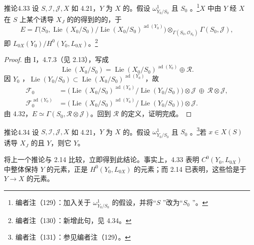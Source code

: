 \begin{SGAresult}{推论}{4.33}
设 $S,\mathscr I,\mathscr J,X$ 如 4.21，$Y$ 为 $X$ 的。假设 $\omega^1_{Y_0/S_0}$ 且 $S_0$ 。\footnote{编者注（129）：加入关于 $\omega^1_{Y_0/S_0}$ 的假设，并将“$S$ ”改为“$S_0$ ”。}$X$ 中由 $Y$ 经 $X$ 在 $S$ 上某个诱导 $X_J$ 的的得到的的，于
\[E=\Gamma\bigl(S_0,\operatorname{Lie}(X_0/S_0)/\operatorname{Lie}(X_0/S_0)^{\operatorname{ad}(Y_0)}\bigr)\otimes_{\Gamma(S_0,\mathscr O_{S_0})}\Gamma(S_0,\mathscr J),\]
即 $L_{0X}(Y_0)/H^0(Y_0,L_{0X})$。\footnote{编者注（130）：新增此句，见 4.34。}
\end{SGAresult}
\begin{proof}
由 I，4.7.3（见 2.13），写成
\[\operatorname{Lie}(X_0/S_0)=\operatorname{Lie}(X_0/S_0)^{\operatorname{ad}(Y_0)}\oplus\mathscr R.\]
因 $Y_0$ ，$\operatorname{Lie}(Y_0/S_0)\subset\operatorname{Lie}(X_0/S_0)^{\operatorname{ad}(Y_0)}$，故
\[
\begin{aligned}
\mathscr F_0&=\bigl(\operatorname{Lie}(X_0/S_0)^{\operatorname{ad}(Y_0)}/\operatorname{Lie}(Y_0/S_0)\bigr)\otimes\mathscr J\ \oplus\ \mathscr R\otimes\mathscr J,\\
\mathscr F_0^{\operatorname{ad}(Y_0)}&=\bigl(\operatorname{Lie}(X_0/S_0)^{\operatorname{ad}(Y_0)}/\operatorname{Lie}(Y_0/S_0)\bigr)\otimes\mathscr J.
\end{aligned}
\]
由 4.32，$E\simeq\Gamma(S_0,\mathscr R\otimes\mathscr J)$。回到 $\mathscr R$ 的定义，证明完成。
\end{proof}
\begin{SGAresult}{推论}{4.34}
设 $S,\mathscr I,\mathscr J,X$ 如 4.21，$Y$ 为 $X$ 的。假设 $\omega^1_{Y_0/S_0}$ 且 $S_0$ 。\footnote{编者注（131）：参见编者注（129）。}若 $x\in X(S)$ 诱导 $X_J$ 的且 $Y$，则它 $Y$。
\end{SGAresult}
将上一个推论与 2.14 比较，立即得到此结论。事实上，4.33 表明 $C^0(Y_0,L_{0X})$ 中整体保持 $Y$ 的元素，正是 $H^0(Y_0,L_{0X})$ 的元素；而 2.14 已表明，这些恰是于 $Y\to X$ 的元素。

